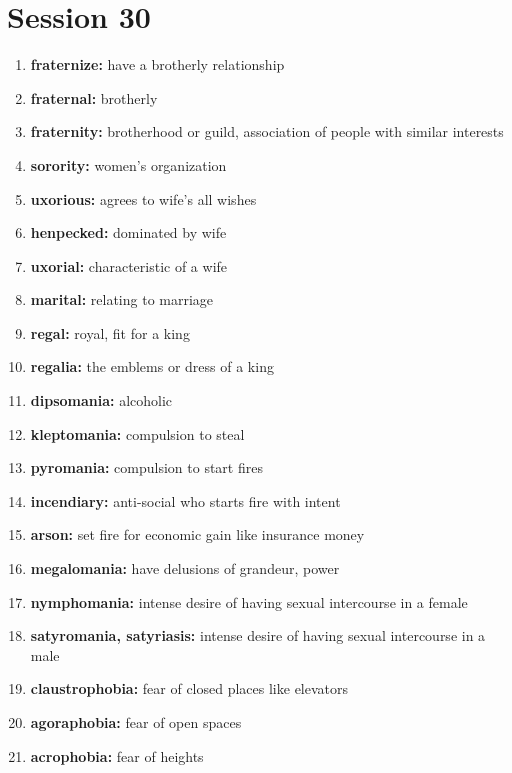 \documentclass{article}
\begin{document}
\section{Session 30}
\begin{enumerate}
    \item \textbf{fraternize: }{have a brotherly relationship}
    \item \textbf{fraternal: }{brotherly}
    \item \textbf{fraternity: }{brotherhood or guild, association of people with similar interests}
    \item \textbf{sorority: }{women's organization}
    \item \textbf{uxorious: }{agrees to wife's all wishes}
    \item \textbf{henpecked: }{dominated by wife}
    \item \textbf{uxorial: }{characteristic of a wife}
    \item \textbf{marital: }{relating to marriage}
    \item \textbf{regal: }{royal, fit for a king}
    \item \textbf{regalia: }{the emblems or dress of a king}
    \item \textbf{dipsomania: }{alcoholic}
    \item \textbf{kleptomania: }{compulsion to steal}
    \item \textbf{pyromania: }{compulsion to start fires}
    \item \textbf{incendiary: }{anti-social who starts fire with intent}
    \item \textbf{arson: }{set fire for economic gain like insurance money}
    \item \textbf{megalomania: }{have delusions of grandeur, power}
    \item \textbf{nymphomania: }{intense desire of having sexual intercourse in a female}
    \item \textbf{satyromania, satyriasis: }{intense desire of having sexual intercourse in a male}
    \item \textbf{claustrophobia: }{fear of closed places like elevators}
    \item \textbf{agoraphobia: }{fear of open spaces}
    \item \textbf{acrophobia: }{fear of heights}
    
\end{enumerate}
\end{document}
